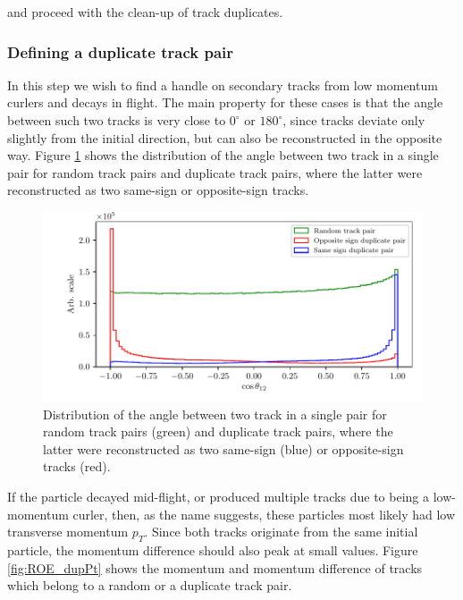 \documentclass[oneside,a4paper,openany,12pt]{scrbook}
\begin{document}
and proceed with the clean-up of track duplicates.

\subsubsection{Defining a duplicate track pair}

In this step we wish to find a handle on secondary tracks from low momentum curlers and decays in flight. The main property for these cases is that the angle between such two tracks is very close to $0^\circ$ or $180^\circ$, since tracks deviate only slightly from the initial direction, but can also be reconstructed in the opposite way. Figure \ref{fig:ROE_dupAngleInit} shows the distribution of the angle between two track in a single pair for random track pairs and duplicate track pairs, where the latter were reconstructed as two same-sign or opposite-sign tracks.

\begin{figure}[H]
\centering
\captionsetup{width=0.8\linewidth}
\includegraphics[width=\linewidth]{fig/ROECleanup_dup_angle_initial}
\caption{Distribution of the angle between two track in a single pair for random track pairs (green) and duplicate track pairs, where the latter were reconstructed as two same-sign (blue) or opposite-sign tracks (red).}
\label{fig:ROE_dupAngleInit}
\end{figure}

If the particle decayed mid-flight, or produced multiple tracks due to being a low-momentum curler, then, as the name suggests, these particles most likely had low transverse momentum $p_T$. Since both tracks originate from the same initial particle, the momentum difference should also peak at small values. Figure \ref{fig:ROE_dupPt} shows the momentum and momentum difference of tracks which belong to a random or a duplicate track pair.
\end{document}
